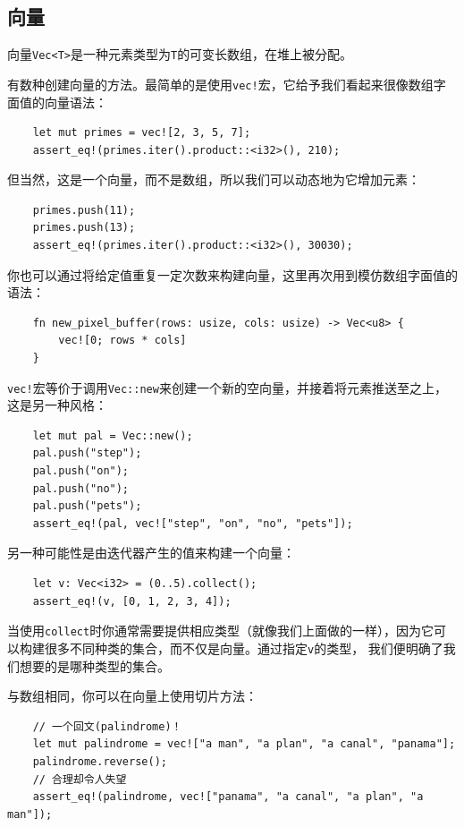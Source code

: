 \medskip
\subsection{向量}
向量\texttt{Vec<T>}是一种元素类型为\texttt{T}的可变长数组，在堆上被分配。

\medskip
有数种创建向量的方法。最简单的是使用\texttt{vec!}宏，它给予我们看起来很像数组字面值的向量语法：
\begin{verbatim}
    let mut primes = vec![2, 3, 5, 7];
    assert_eq!(primes.iter().product::<i32>(), 210);
\end{verbatim}
 
\smallskip
但当然，这是一个向量，而不是数组，所以我们可以动态地为它增加元素：
\begin{verbatim}
    primes.push(11);
    primes.push(13);
    assert_eq!(primes.iter().product::<i32>(), 30030);
\end{verbatim}
 
\smallskip
你也可以通过将给定值重复一定次数来构建向量，这里再次用到模仿数组字面值的语法：
\begin{verbatim}
    fn new_pixel_buffer(rows: usize, cols: usize) -> Vec<u8> {
        vec![0; rows * cols]
    }
\end{verbatim}
 
\smallskip
\texttt{vec!}宏等价于调用\texttt{Vec::new}来创建一个新的空向量，并接着将元素推送至之上，这是另一种风格：
\begin{verbatim}
    let mut pal = Vec::new();
    pal.push("step");
    pal.push("on");
    pal.push("no");
    pal.push("pets");
    assert_eq!(pal, vec!["step", "on", "no", "pets"]);
\end{verbatim}
 
\smallskip
另一种可能性是由迭代器产生的值来构建一个向量：
\begin{verbatim}
    let v: Vec<i32> = (0..5).collect();
    assert_eq!(v, [0, 1, 2, 3, 4]);
\end{verbatim}
 
\smallskip
当使用\texttt{collect}时你通常需要提供相应类型（就像我们上面做的一样），因为它可以构建很多不同种类的集合，而不仅是向量。通过指定\texttt{v}的类型，
我们便明确了我们想要的是哪种类型的集合。

\medskip
与数组相同，你可以在向量上使用切片方法：
\begin{verbatim}
    // 一个回文(palindrome)！
    let mut palindrome = vec!["a man", "a plan", "a canal", "panama"];
    palindrome.reverse();
    // 合理却令人失望
    assert_eq!(palindrome, vec!["panama", "a canal", "a plan", "a man"]);
\end{verbatim}
 
